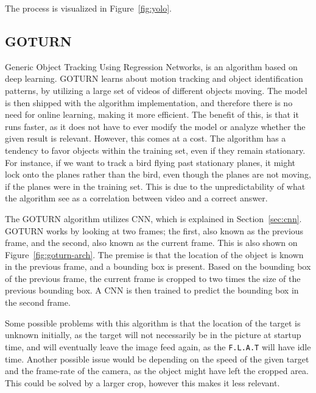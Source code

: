 The process is visualized in Figure~\ref{fig:yolo}.


\subsection{GOTURN}
Generic Object Tracking Using Regression Networks, is an algorithm based on deep learning\cite{goturn}.
GOTURN learns about motion tracking and object identification patterns, by utilizing a large set of videos of different objects moving.
The model is then shipped with the algorithm implementation, and therefore there is no need for online learning, making it more efficient.
The benefit of this, is that it runs faster, as it does not have to ever modify the model or analyze whether the given result is relevant.
However, this comes at a cost. 
The algorithm has a tendency to favor objects within the training set, even if they remain stationary.
For instance, if we want to track a bird flying past stationary planes, it might lock onto the planes rather than the bird, even though the planes are not moving, if the planes were in the training set.
This is due to the unpredictability of what the algorithm see as a correlation between video and a correct answer.


The GOTURN algorithm utilizes CNN, which is explained in Section~\ref{sec:cnn}.
GOTURN works by looking at two frames; the first, also known as the previous frame, and the second, also known as the current frame.
This is also shown on Figure~\ref{fig:goturn-arch}.
The premise is that the location of the object is known in the previous frame, and a bounding box is present.
Based on the bounding box of the previous frame, the current frame is cropped to two times the size of the previous bounding box.
A CNN is then trained to predict the bounding box in the second frame.

Some possible problems with this algorithm is that the location of the target is unknown initially, as the target will not necessarily be in the picture at startup time, and will eventually leave the image feed again, as the \texttt{F.L.A.T} will have idle time.
Another possible issue would be depending on the speed of the given target and the frame-rate of the camera, as the object might have left the cropped area. 
This could be solved by a larger crop, however this makes it less relevant.


